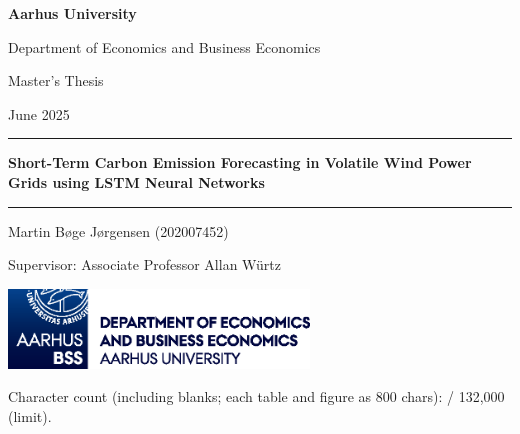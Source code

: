 \thispagestyle{empty}

\begin{titlepage}
    \thispagestyle{empty}

    \begin{center}
        {\Large \textbf{Aarhus University}}

        Department of Economics and Business Economics

        \vspace{1cm}

        {\large Master's Thesis}

        {\large June 2025\par}

        \vspace{0.8cm}

        \rule{\linewidth}{1pt}\par

        \vspace{0.5cm}

        {\huge \textbf{Short-Term Carbon Emission Forecasting in Volatile Wind Power Grids using LSTM Neural Networks}}

        \vspace{0.15cm}
        \rule{\linewidth}{1pt}\par

        \vspace{1cm}

        {\large Martin Bøge Jørgensen (202007452)}

        Supervisor: Associate Professor Allan Würtz

        \vfill

        \includegraphics[width=8cm]{sections/figures/au_bss_logo.eps}

        \vspace{0.5cm}

        Character count (including blanks; each table and figure as 800 chars): / 132,000 (limit).
        \normalsize
    \end{center}
\end{titlepage}
